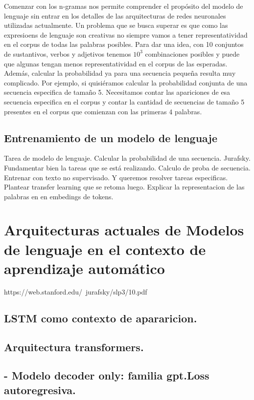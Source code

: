\documentclass[11pt,a4paper,twoside]{tesis}
\begin{document}
Comenzar con los n-gramas nos permite comprender el propósito del modelo de lenguaje sin entrar en los detalles de las arquitecturas de redes neuronales utilizadas actualmente. Un problema que se busca superar es que como las expresioens de lenguaje son creativas no siempre vamos a tener representatividad en el corpus de todas las palabras posibles. Para dar una idea, con 10 conjuntos de sustantivos, verbos y adjetivos tenemos $10^3$ combinaciones posibles y puede que algunas tengan menos representatividad en el corpus de las esperadas. Además, calcular la probabilidad ya para una secuencia pequeña resulta muy complicado. Por ejemplo, si quisiéramos calcular la probabilidad conjunta de una secuencia especifica de tamaño 5. Necesitamos contar las apariciones de esa secuencia especifica en el corpus y contar la cantidad de secuencias de tamaño 5 presentes en el corpus que comienzan con las primeras 4 palabras. \cite{jurafsky2014speech} \\

\subsection{Entrenamiento de un modelo de lenguaje}

Tarea de modelo de lenguaje. Calcular la probabilidad de una secuencia. Jurafsky. Fundamentar bien la tareas que se está realizando. 
Calculo de proba de secuencia. Entrenar con texto no supervisado. Y queremos resolver tareas especificas. Plantear transfer learning que se retoma luego.
Explicar la representacion de las palabras en en embedings de tokens.



\section{Arquitecturas actuales de Modelos de lenguaje en el contexto de aprendizaje automático}

https://web.stanford.edu/~jurafsky/slp3/10.pdf

\subsection{LSTM como contexto de apararicion.}
\subsection{Arquitectura transformers.}
\subsection{- Modelo decoder only: familia gpt.Loss autoregresiva.}
\end{document}
